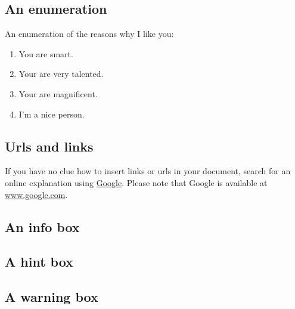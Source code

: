 \documentclass{42-en}
\begin{document}
        \subsection{An enumeration}

            An enumeration of the reasons why I like you:\\

            \begin{enumerate}\itemsep7pt
                \item You are smart.
                \item Your are very talented.
                \item Your are magnificent.
                \item I'm a nice person.
            \end{enumerate}


        \subsection{Urls and links}

            If you have no clue how to insert links or urls in your
            document, search for an online explanation using
            \href{www.google.com}{Google}. Please note that Google is
            available at \url{www.google.com}.


        \newpage


        \subsection{An info box}



        \subsection{A hint box}



        \subsection{A warning box}



        \newpage
\end{document}
